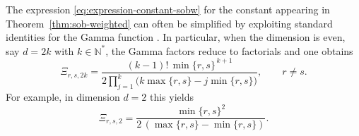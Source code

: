 \documentclass[a4paper,12pt]{article}
\let\originalleft\left
\let\originalright\right
\renewcommand{\left}{\mathopen{}\mathclose\bgroup\originalleft}
\renewcommand{\right}{\aftergroup\egroup\originalright}
\newcommand{\N}{\mathbb{N}}
\begin{document}








\noindent
The expression \eqref{eq:expression-constant-sobw} for the constant appearing in
Theorem~\ref{thm:sob-weighted} can often be simplified by exploiting standard
identities for the Gamma function \cite{artin}. 
In particular, when the dimension is even, say $d=2k$ with $k\in\N^*$,
the Gamma factors reduce to factorials and one obtains
\[
\Xi_{r,s,2k}
=
\frac{(k-1)!\,\min\{r,s\}^{\,k+1}}
{2\prod_{j=1}^{k}\bigl(k\max\{r,s\}-j\min\{r,s\}\bigr)},
\qquad r\neq s .
\]
For example, in dimension $d=2$ this yields
\[
\Xi_{r,s,2}
=
\frac{\min\{r,s\}^2}{2\, (\max\{r,s\}-\min\{r,s\})}.
\]

\color{black}

\end{document}
